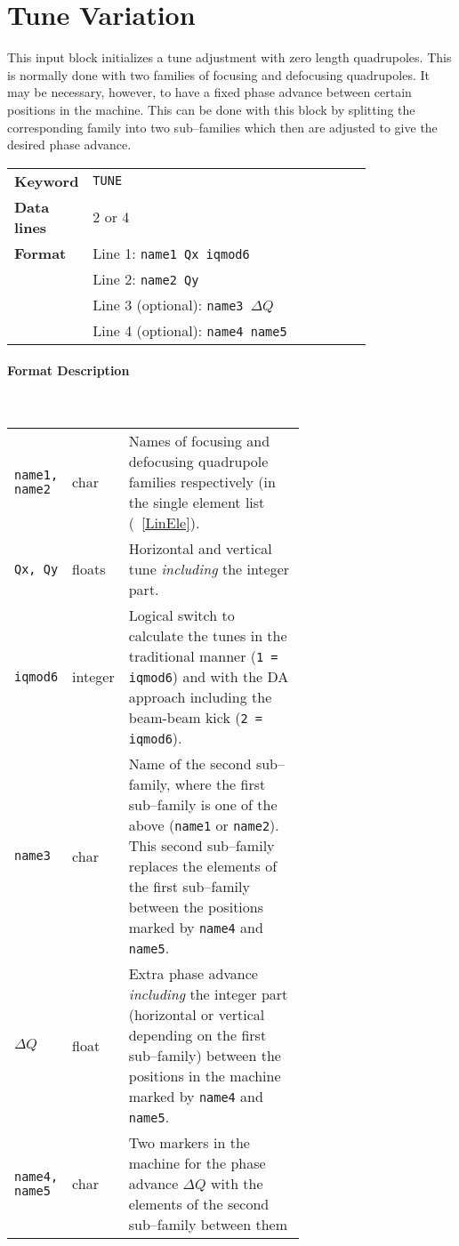 \section{Tune Variation} \label{TunVar}

This input block initializes a tune adjustment with zero length quadrupoles.
This is normally done with two families of focusing and defocusing quadrupoles.
It may be necessary, however, to have a fixed phase advance between certain positions in the machine.
This can be done with this block by splitting the corresponding family into two sub--families which then are adjusted to give the desired phase advance.

\bigskip
\begin{tabular}{@{}lp{0.8\linewidth}}
    \textbf{Keyword}    & \texttt{TUNE} \\
    \textbf{Data lines} & 2 or 4 \\
    \textbf{Format}     & Line 1: \texttt{name1 Qx iqmod6} \\
                        & Line 2: \texttt{name2 Qy} \\
                        & Line 3 (optional): \texttt{name3 $\Delta Q$} \\
                        & Line 4 (optional): \texttt{name4 name5}
\end{tabular}

\paragraph{Format Description}~

\bigskip
\begin{longtabu}{@{}llp{0.65\linewidth}}
    \texttt{name1, name2} & char    & Names of focusing and defocusing quadrupole families respectively (in the single element list (~\ref{LinEle}). \\
    \texttt{Qx, Qy}       & floats  & Horizontal and vertical tune \emph{including} the integer part. \\
    \texttt{iqmod6}       & integer & Logical switch to calculate the tunes in the traditional manner (\texttt{1 = iqmod6}) and with the DA approach including the beam-beam kick (\texttt{2 = iqmod6}). \\
    \texttt{name3}        & char    & Name of the second sub--family, where the first sub--family is one of the above (\texttt{name1} or \texttt{name2}). This second sub--family replaces the elements of the first sub--family between the positions marked by \texttt{name4} and \texttt{name5}. \\
    \texttt{$\Delta Q$}   & float   & Extra phase advance \emph{including} the integer part (horizontal or vertical depending on the first sub--family) between the positions in the machine marked by \texttt{name4} and \texttt{name5}.\\
    \texttt{name4, name5} & char    & Two markers in the machine for the phase advance $\Delta Q$ with the elements of the second sub--family between them
\end{longtabu}

